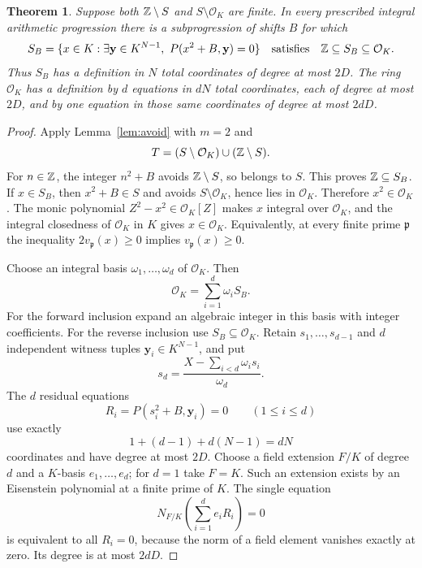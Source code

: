 \documentclass[11pt,a4paper]{article}
\newtheorem{theorem}{Theorem}[section]
\newcommand{\OK}{\mathcal O_K}
\begin{document}
\begin{theorem}\label{thm:ring}
Suppose both $\mathbb Z\setminus S$ and $S\setminus\OK$ are finite.
In every prescribed integral arithmetic progression there is a
subprogression of shifts $B$ for which
\begin{equation}\label{eq:intermediate}
 S_B=\{x\in K:\exists\mathbf y\in K^{N-1},
                      \ P(x^2+B,\mathbf y)=0\}
 \quad\text{satisfies}\quad \Z\subseteq S_B\subseteq\OK.
\end{equation}
Thus $S_B$ has a definition in $N$ total coordinates of degree at
most $2D$. The ring $\OK$ has a definition by $d$ equations in
$dN$ total coordinates, each of degree at most $2D$, and by one
equation in those same coordinates of degree at most $2dD$.
\end{theorem}
\begin{proof}
Apply Lemma~\ref{lem:avoid} with $m=2$ and
\[
 T=(S\setminus\OK)\cup(\Z\setminus S).
\]
For $n\in\mathbb Z$, the integer $n^2+B$ avoids $\mathbb Z\setminus S$, so
belongs to $S$. This proves $\mathbb Z\subseteq S_B$.
If $x\in S_B$, then $x^2+B\in S$ and avoids
$S\setminus\OK$, hence lies in $\OK$. Therefore
$x^2\in\OK$. The monic polynomial $Z^2-x^2\in\OK[Z]$ makes
$x$ integral over $\OK$, and the integral closedness of $\OK$
in $K$ gives $x\in\OK$. Equivalently, at every finite prime
$\mathfrak p$ the inequality $2v_\mathfrak p(x)\ge0$ implies
$v_\mathfrak p(x)\ge0$.

Choose an integral basis $\omega_1,\ldots,\omega_d$ of $\OK$.
Then
\[
                     \OK=\sum_{i=1}^d\omega_i S_B.
\]
For the forward inclusion expand an algebraic integer in this basis
with integer coefficients. For the reverse inclusion use
$S_B\subseteq\OK$.
Retain $s_1,\ldots,s_{d-1}$ and $d$ independent witness tuples
$\mathbf y_i\in K^{N-1}$, and put
\[
 s_d=\frac{X-\sum_{i<d}\omega_i s_i}{\omega_d}.
\]
The $d$ residual equations
\[
             R_i=P(s_i^2+B,\mathbf y_i)=0
             \qquad(1\le i\le d)
\]
use exactly
\[
                 1+(d-1)+d(N-1)=dN
\]
coordinates and have degree at most $2D$.
Choose a field extension $F/K$ of degree $d$ and a $K$-basis
$e_1,\ldots,e_d$; for $d=1$ take $F=K$. Such an extension exists
by an Eisenstein polynomial at a finite prime of $K$.
The single equation
\[
                N_{F/K}\left(\sum_{i=1}^d e_iR_i\right)=0
\]
is equivalent to all $R_i=0$, because the norm of a field element
vanishes exactly at zero. Its degree is at most $2dD$.
\end{proof}
\end{document}
